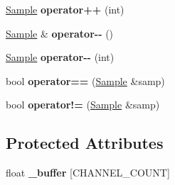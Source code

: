 \begin{DoxyCompactItemize}
\item 
\hypertarget{class_sample_a03370bb2bf15aa6266e14d53d49251ba}{\hyperlink{class_sample}{Sample} {\bfseries operator++} (int)}\label{class_sample_a03370bb2bf15aa6266e14d53d49251ba}

\item 
\hypertarget{class_sample_aadb504516ba16de8f2758b7adac8ede2}{\hyperlink{class_sample}{Sample} \& {\bfseries operator-\/-\/} ()}\label{class_sample_aadb504516ba16de8f2758b7adac8ede2}

\item 
\hypertarget{class_sample_a617e3094715d2ffd6047426f841fea3d}{\hyperlink{class_sample}{Sample} {\bfseries operator-\/-\/} (int)}\label{class_sample_a617e3094715d2ffd6047426f841fea3d}

\item 
\hypertarget{class_sample_a6c226d80c462e7988337462de402506e}{bool {\bfseries operator==} (\hyperlink{class_sample}{Sample} \&samp)}\label{class_sample_a6c226d80c462e7988337462de402506e}

\item 
\hypertarget{class_sample_ae2dbf61ce100679feceee5a94356ba4e}{bool {\bfseries operator!=} (\hyperlink{class_sample}{Sample} \&samp)}\label{class_sample_ae2dbf61ce100679feceee5a94356ba4e}

\end{DoxyCompactItemize}
\subsection*{Protected Attributes}
\begin{DoxyCompactItemize}
\item 
\hypertarget{class_sample_a3ad8c4bd37e78dbf12797b6ccd530c16}{float {\bfseries \+\_\+buffer} \mbox{[}C\+H\+A\+N\+N\+E\+L\+\_\+\+C\+O\+U\+N\+T\mbox{]}}\label{class_sample_a3ad8c4bd37e78dbf12797b6ccd530c16}

\end{DoxyCompactItemize}
